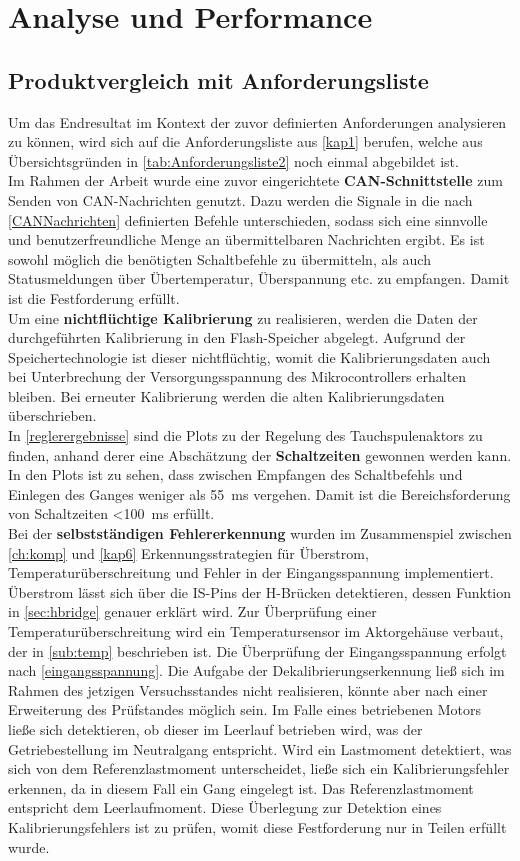 \chapter{Analyse und Performance}\label{kap7}
\section{Produktvergleich mit Anforderungsliste}\label{vergleich}
Um das Endresultat im Kontext der zuvor definierten Anforderungen analysieren zu können, wird sich auf die Anforderungsliste aus \autoref{kap1} berufen, welche aus Übersichtsgründen in \autoref{tab:Anforderungsliste2} noch einmal abgebildet ist.\\ 
Im Rahmen der Arbeit wurde eine zuvor eingerichtete \textbf{CAN-Schnittstelle} zum Senden von CAN-Nachrichten genutzt. Dazu werden die Signale in die nach \autoref{CANNachrichten} definierten Befehle unterschieden, sodass sich eine sinnvolle und benutzerfreundliche Menge an übermittelbaren Nachrichten ergibt. Es ist sowohl möglich die benötigten Schaltbefehle zu übermitteln, als auch Statusmeldungen über Übertemperatur, Überspannung etc. zu empfangen. Damit ist die Festforderung erfüllt.\\
Um eine \textbf{nichtflüchtige Kalibrierung} zu realisieren, werden die Daten der durchgeführten Kalibrierung in den Flash-Speicher abgelegt. Aufgrund der Speichertechnologie ist dieser nichtflüchtig, womit die Kalibrierungsdaten auch bei Unterbrechung der Versorgungsspannung des Mikrocontrollers erhalten bleiben. Bei erneuter Kalibrierung werden die alten Kalibrierungsdaten überschrieben.\\
In \autoref{reglerergebnisse} sind die Plots zu der Regelung des Tauchspulenaktors zu finden, anhand derer eine Abschätzung der \textbf{Schaltzeiten} gewonnen werden kann. In den Plots ist zu sehen, dass zwischen Empfangen des Schaltbefehls und Einlegen des Ganges weniger als \SI{55}{ms} vergehen. Damit ist die Bereichsforderung von Schaltzeiten \SI{<100}{ms} erfüllt.\\
Bei der \textbf{selbstständigen Fehlererkennung} wurden im Zusammenspiel zwischen \autoref{ch:komp} und \autoref{kap6} Erkennungsstrategien für Überstrom, Temperaturüberschreitung und Fehler in der Eingangsspannung implementiert. Überstrom lässt sich über die IS-Pins der H-Brücken detektieren, dessen Funktion in \autoref{sec:hbridge} genauer erklärt wird. Zur Überprüfung einer Temperaturüberschreitung wird ein Temperatursensor im Aktorgehäuse verbaut, der in \autoref{sub:temp} beschrieben ist. Die Überprüfung der Eingangsspannung erfolgt nach \autoref{eingangsspannung}. Die Aufgabe der Dekalibrierungserkennung ließ sich im Rahmen des jetzigen Versuchsstandes nicht realisieren, könnte aber nach einer Erweiterung des Prüfstandes möglich sein. Im Falle eines betriebenen Motors ließe sich detektieren, ob dieser im Leerlauf betrieben wird, was der Getriebestellung im Neutralgang entspricht. Wird ein Lastmoment detektiert, was sich von dem Referenzlastmoment unterscheidet, ließe sich ein Kalibrierungsfehler erkennen, da in diesem Fall ein Gang eingelegt ist. Das Referenzlastmoment entspricht dem Leerlaufmoment. Diese Überlegung zur Detektion eines Kalibrierungsfehlers ist zu prüfen, womit diese Festforderung nur in Teilen erfüllt wurde.\\
